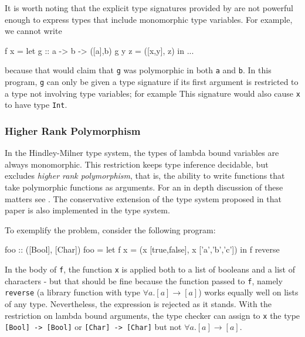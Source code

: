It is worth noting that the explicit type signatures provided by \frege{} are not powerful enough to express types that include monomorphic type variables.
For example, we cannot write
\begin{code}
    f x = let
            g :: a -> b -> ([a],b)
            g y z = ([x,y], z)
        in ...
\end{code}
because that would claim that \texttt{g} was polymorphic in both \texttt{a} and \texttt{b}. In this program, \texttt{g} can only be given a type signature if its first argument is restricted to a type not involving type variables; for example 
This signature would also cause \texttt{x} to have type \texttt{Int}.

\subsubsection{Higher Rank Polymorphism} \label{higher-rank}

In the Hindley-Milner type system, the types of lambda bound variables are always monomorphic. This restriction keeps type inference decidable, but excludes \emph{higher rank polymorphism}, that is, the ability to write functions that take polymorphic functions as arguments. For an in depth discussion of these matters see \cite{ptifart}. The conservative extension of the type system proposed in that paper is also implemented in the \frege{} type system.

To exemplify the problem, consider the following program:

\begin{code}
foo :: ([Bool], [Char])
foo = let
        f x = (x [true,false], x ['a','b','c'])
    in f reverse
\end{code}

In the body of \texttt{f}, the function \texttt{x} is applied both to a list of booleans and a list of characters - but that should be fine because the function passed to \texttt{f}, namely \texttt{reverse} (a library function with type $\forall{} a$.$[a] \rightarrow{} [a]$) works equally well on lists of any type. Nevertheless, the expression is rejected as it stands. With the restriction on lambda bound arguments, the type checker can assign to \texttt{x} the type \texttt{[Bool] -> [Bool]} or \texttt{[Char] -> [Char]} but not $\forall{} a$.$[a] \rightarrow{} [a]$.

